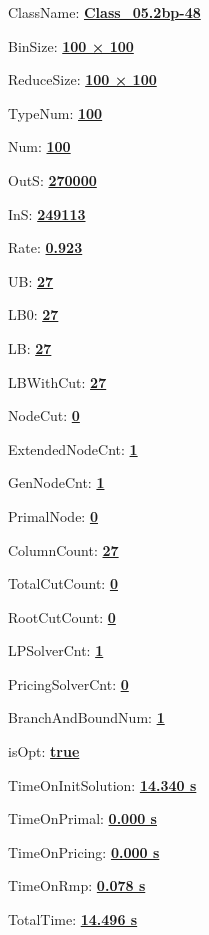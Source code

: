 \documentclass[11pt]{article}
\begin{document}
\pagestyle{empty}


ClassName: \underline{\textbf{Class_05.2bp-48}}
\par
BinSize: \underline{\textbf{100 × 100}}
\par
ReduceSize: \underline{\textbf{100 × 100}}
\par
TypeNum: \underline{\textbf{100}}
\par
Num: \underline{\textbf{100}}
\par
OutS: \underline{\textbf{270000}}
\par
InS: \underline{\textbf{249113}}
\par
Rate: \underline{\textbf{0.923}}
\par
UB: \underline{\textbf{27}}
\par
LB0: \underline{\textbf{27}}
\par
LB: \underline{\textbf{27}}
\par
LBWithCut: \underline{\textbf{27}}
\par
NodeCut: \underline{\textbf{0}}
\par
ExtendedNodeCnt: \underline{\textbf{1}}
\par
GenNodeCnt: \underline{\textbf{1}}
\par
PrimalNode: \underline{\textbf{0}}
\par
ColumnCount: \underline{\textbf{27}}
\par
TotalCutCount: \underline{\textbf{0}}
\par
RootCutCount: \underline{\textbf{0}}
\par
LPSolverCnt: \underline{\textbf{1}}
\par
PricingSolverCnt: \underline{\textbf{0}}
\par
BranchAndBoundNum: \underline{\textbf{1}}
\par
isOpt: \underline{\textbf{true}}
\par
TimeOnInitSolution: \underline{\textbf{14.340 s}}
\par
TimeOnPrimal: \underline{\textbf{0.000 s}}
\par
TimeOnPricing: \underline{\textbf{0.000 s}}
\par
TimeOnRmp: \underline{\textbf{0.078 s}}
\par
TotalTime: \underline{\textbf{14.496 s}}
\par
\newpage


\end{document}
